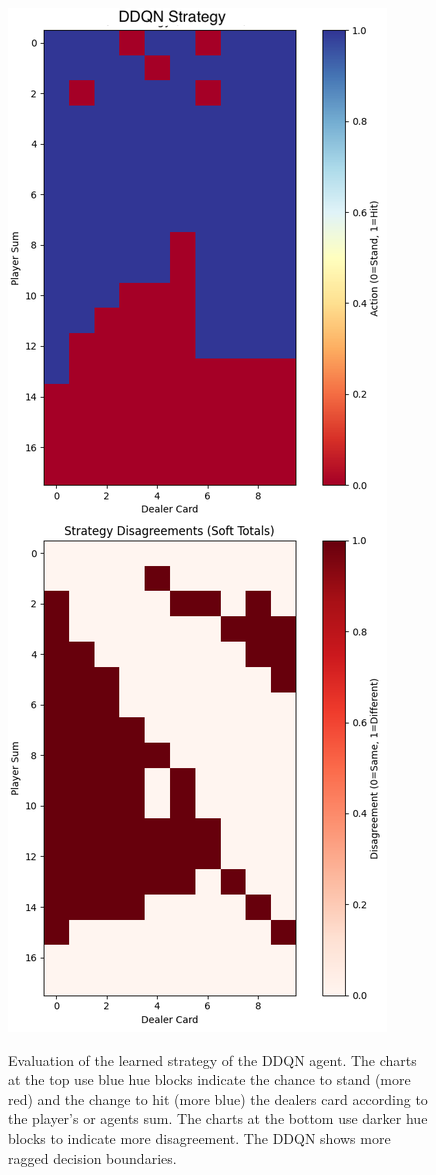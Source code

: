 \documentclass[compsoc]{IEEEtran}
\begin{document}
{\begin{figure}[h]
\centering
{\includegraphics[scale=0.3]{./fig/q2c_vs_ddqn_strategy_map_ddqn.png}}
\caption{Evaluation of the learned strategy of the DDQN agent. The charts at the top use blue hue blocks indicate the chance to stand (more red) and the change to hit (more blue) the dealers card according to the player's or agents sum. The charts at the bottom use darker hue blocks to indicate more disagreement. The DDQN shows more ragged decision boundaries.}
\end{figure}



}
\end{document}
